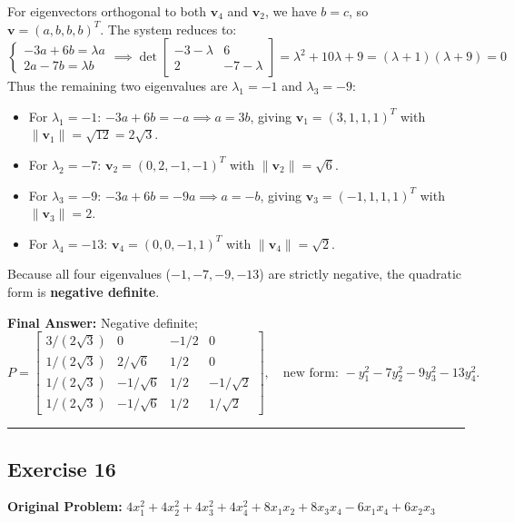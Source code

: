 \documentclass[11pt, letterpaper]{article}
\theoremstyle{definition}
\theoremstyle{remark}
\begin{document}
For eigenvectors orthogonal to both $\mathbf{v}_4$ and $\mathbf{v}_2$, we have $b = c$, so $\mathbf{v} = (a, b, b, b)^T$. The system reduces to:
\[
\begin{cases} -3a + 6b = \lambda a \\ 2a - 7b = \lambda b \end{cases} \implies \det \begin{bmatrix} -3-\lambda & 6 \\ 2 & -7-\lambda \end{bmatrix} = \lambda^2 + 10\lambda + 9 = (\lambda + 1)(\lambda + 9) = 0
\]
Thus the remaining two eigenvalues are $\lambda_1 = -1$ and $\lambda_3 = -9$:
\begin{itemize}
    \item For $\lambda_1 = -1$: $-3a + 6b = -a \implies a = 3b$, giving $\mathbf{v}_1 = (3, 1, 1, 1)^T$ with $\|\mathbf{v}_1\| = \sqrt{12} = 2\sqrt{3}$.
    \item For $\lambda_2 = -7$: $\mathbf{v}_2 = (0, 2, -1, -1)^T$ with $\|\mathbf{v}_2\| = \sqrt{6}$.
    \item For $\lambda_3 = -9$: $-3a + 6b = -9a \implies a = -b$, giving $\mathbf{v}_3 = (-1, 1, 1, 1)^T$ with $\|\mathbf{v}_3\| = 2$.
    \item For $\lambda_4 = -13$: $\mathbf{v}_4 = (0, 0, -1, 1)^T$ with $\|\mathbf{v}_4\| = \sqrt{2}$.
\end{itemize}
Because all four eigenvalues ($-1, -7, -9, -13$) are strictly negative, the quadratic form is \textbf{negative definite}.

\textbf{Final Answer:} Negative definite;
\[
P = \begin{bmatrix} 3/(2\sqrt{3}) & 0 & -1/2 & 0 \\ 1/(2\sqrt{3}) & 2/\sqrt{6} & 1/2 & 0 \\ 1/(2\sqrt{3}) & -1/\sqrt{6} & 1/2 & -1/\sqrt{2} \\ 1/(2\sqrt{3}) & -1/\sqrt{6} & 1/2 & 1/\sqrt{2} \end{bmatrix}, \quad \text{new form: } -y_1^2 - 7y_2^2 - 9y_3^2 - 13y_4^2.
\]

\medskip\hrule\medskip

\subsection*{Exercise 16}
\textbf{Original Problem:} $4x_1^2 + 4x_2^2 + 4x_3^2 + 4x_4^2 + 8x_1x_2 + 8x_3x_4 - 6x_1x_4 + 6x_2x_3$
\end{document}
